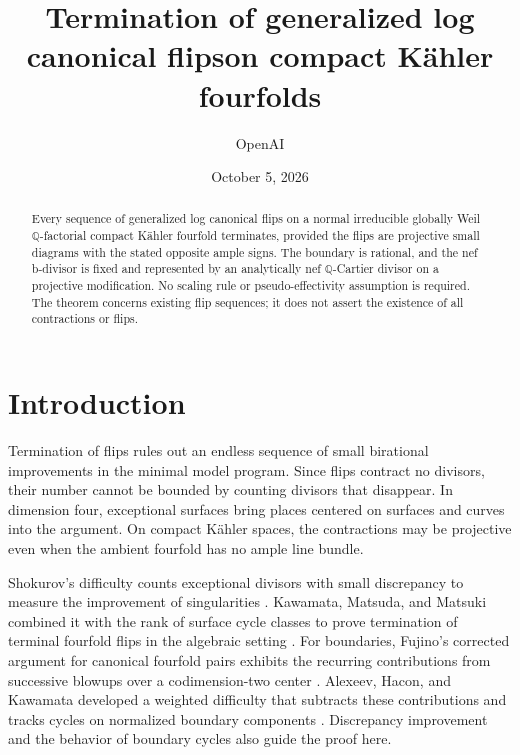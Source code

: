 \documentclass[11pt]{amsart}
\title[Generalized log canonical flips on K\"ahler fourfolds]{Termination of generalized log canonical flips\newline on compact K\"ahler fourfolds}
\author{OpenAI}
\date{October 5, 2026}
\theoremstyle{definition}
\theoremstyle{remark}
\numberwithin{equation}{section}
\newcommand{\Q}{\mathbb{Q}}
\begin{document}
\begin{abstract}
Every sequence of generalized log canonical flips on a normal irreducible globally Weil \(\Q\)-factorial compact K\"ahler fourfold terminates, provided the flips are projective small diagrams with the stated opposite ample signs. The boundary is rational, and the nef b-divisor is fixed and represented by an analytically nef \(\Q\)-Cartier divisor on a projective modification. No scaling rule or pseudo-effectivity assumption is required. The theorem concerns existing flip sequences; it does not assert the existence of all contractions or flips.

\end{abstract}
\maketitle
\tableofcontents

\section{Introduction}\label{sec:introduction}

Termination of flips rules out an endless sequence of small birational improvements in the minimal model program. Since flips contract no divisors, their number cannot be bounded by counting divisors that disappear. In dimension four, exceptional surfaces bring places centered on surfaces and curves into the argument. On compact K\"ahler spaces, the contractions may be projective even when the ambient fourfold has no ample line bundle.

Shokurov's difficulty counts exceptional divisors with small discrepancy to measure the improvement of singularities \cite[Definition~2.15 and Corollaries~2.16--2.17]{ShokurovNonvanishing}. Kawamata, Matsuda, and Matsuki combined it with the rank of surface cycle classes to prove termination of terminal fourfold flips in the algebraic setting \cite[Theorem~5-1-15]{KawamataMatsudaMatsuki1987}. For boundaries, Fujino's corrected argument for canonical fourfold pairs exhibits the recurring contributions from successive blowups over a codimension-two center \cite[Example~2.1 and Theorems~5.1--5.2]{Fujino2005Addendum}. Alexeev, Hacon, and Kawamata developed a weighted difficulty that subtracts these contributions and tracks cycles on normalized boundary components \cite[Section~2]{AlexeevHaconKawamata2007}. Discrepancy improvement and the behavior of boundary cycles also guide the proof here.
\end{document}

